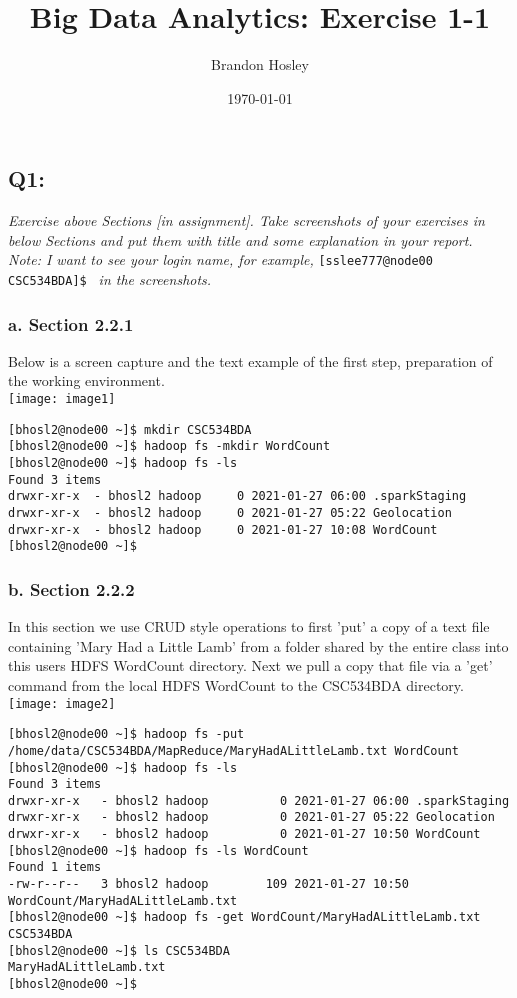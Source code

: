 \documentclass[]{article}
\title{Big Data Analytics: Exercise 1-1}
\author{Brandon Hosley}
\date{\today}
\begin{document}
\maketitle

\subsection*{Q1:}
\emph{Exercise above Sections [in assignment]. 
	Take screenshots of your exercises in below Sections and put
	them with title and some explanation in your report. \\
	Note: I want to see your login name, for example, }
	\texttt{[sslee777@node00 CSC534BDA]\$ } 
	\emph{ in the screenshots.
}

\subsubsection*{a. Section 2.2.1}
Below is a screen capture and the text example of the first step, preparation of the working environment. \\
\texttt{[image: image1]} \vspace{-1.5em}
\begin{verbatim}
[bhosl2@node00 ~]$ mkdir CSC534BDA
[bhosl2@node00 ~]$ hadoop fs -mkdir WordCount
[bhosl2@node00 ~]$ hadoop fs -ls
Found 3 items
drwxr-xr-x  - bhosl2 hadoop     0 2021-01-27 06:00 .sparkStaging
drwxr-xr-x  - bhosl2 hadoop     0 2021-01-27 05:22 Geolocation
drwxr-xr-x  - bhosl2 hadoop     0 2021-01-27 10:08 WordCount
[bhosl2@node00 ~]$
\end{verbatim}

\clearpage

\subsubsection*{b. Section 2.2.2}\vspace{-0.5em}
In this section we use CRUD style operations to first 'put' a copy of a text file containing 'Mary Had a Little Lamb' from a folder shared by the entire class into this users HDFS WordCount directory. Next we pull a copy that file via a 'get' command from the local HDFS WordCount to the CSC534BDA directory. \\
\texttt{[image: image2]} \vspace{-2em}
\begin{verbatim}
[bhosl2@node00 ~]$ hadoop fs -put /home/data/CSC534BDA/MapReduce/MaryHadALittleLamb.txt WordCount
[bhosl2@node00 ~]$ hadoop fs -ls
Found 3 items
drwxr-xr-x   - bhosl2 hadoop          0 2021-01-27 06:00 .sparkStaging
drwxr-xr-x   - bhosl2 hadoop          0 2021-01-27 05:22 Geolocation
drwxr-xr-x   - bhosl2 hadoop          0 2021-01-27 10:50 WordCount
[bhosl2@node00 ~]$ hadoop fs -ls WordCount
Found 1 items
-rw-r--r--   3 bhosl2 hadoop        109 2021-01-27 10:50 WordCount/MaryHadALittleLamb.txt
[bhosl2@node00 ~]$ hadoop fs -get WordCount/MaryHadALittleLamb.txt CSC534BDA
[bhosl2@node00 ~]$ ls CSC534BDA
MaryHadALittleLamb.txt
[bhosl2@node00 ~]$ 
\end{verbatim}
\end{document}

